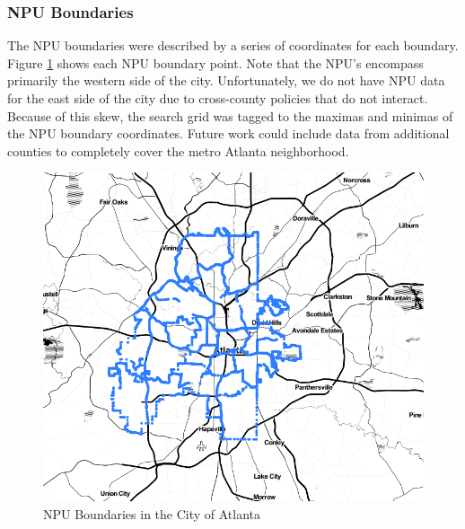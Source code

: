 \documentclass[11pt]{amsart}
\begin{document}
\subsubsection{NPU Boundaries}
The NPU boundaries were described by a series of coordinates for each boundary. Figure \ref{fig:npuoutlines} shows each NPU boundary point. Note that the NPU's encompass primarily the western side of the city. Unfortunately, we do not have NPU data for the east side of the city due to cross-county policies that do not interact. Because of this skew, the search grid was tagged to the maximas and minimas of the NPU boundary coordinates. Future work could include data from additional counties to completely cover the metro Atlanta neighborhood. 
\begin{figure}[h]
\includegraphics[width=\textwidth]{NPUoutlines.png}
\caption{NPU Boundaries in the City of Atlanta}
\label{fig:npuoutlines}
\end{figure}
\end{document}
